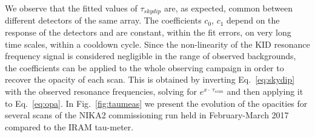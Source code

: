 \documentclass[]{aa} %
\begin{document}

We observe that the fitted values of $\tau_{skydip}$ are, as expected,
common between different detectors of the same array. The coefficients
$c_0$, $c_1$ depend on the response of the detectors and are constant,
within the fit errors, on very long time scales, within a cooldown
cycle. Since the non-linearity of the KID resonance frequency signal
is considered negligible in the range of observed backgrounds, the
coefficients can be applied to the whole observing campaign in order
to recover the opacity of each scan. This is obtained by inverting
Eq.~\ref{eq:skydip} with the observed resonance frequencies, solving
for $e^{x \cdot\ \tau_{scan}}$ and then applying it to
Eq.~\ref{eq:opa}. In Fig.~\ref{fig:taumeas} we present the evolution
of the opacities for several scans of the NIKA2 commissioning run held
in February-March 2017 compared to the IRAM tau-meter.
\end{document}
